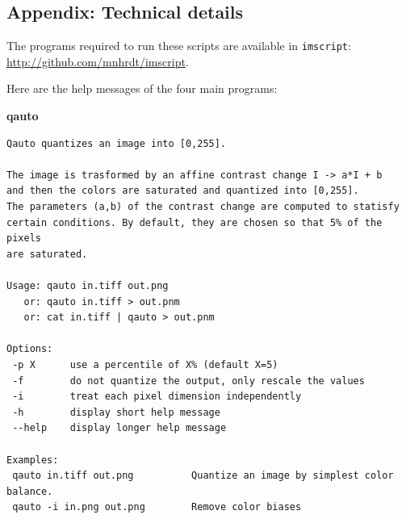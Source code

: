 %
%

\subsection{Appendix: Technical details}

The programs required to run these scripts are available in \verb+imscript+:
\url{http://github.com/mnhrdt/imscript}.

Here are the help messages of the four main programs:

{\bf qauto}
 \begin{verbatim}
Qauto quantizes an image into [0,255].

The image is trasformed by an affine contrast change I -> a*I + b
and then the colors are saturated and quantized into [0,255].
The parameters (a,b) of the contrast change are computed to statisfy
certain conditions. By default, they are chosen so that 5% of the pixels
are saturated.

Usage: qauto in.tiff out.png
   or: qauto in.tiff > out.pnm
   or: cat in.tiff | qauto > out.pnm

Options:
 -p X      use a percentile of X% (default X=5)
 -f        do not quantize the output, only rescale the values
 -i        treat each pixel dimension independently
 -h        display short help message
 --help    display longer help message

Examples:
 qauto in.tiff out.png          Quantize an image by simplest color balance.
 qauto -i in.png out.png        Remove color biases
 \end{verbatim}

